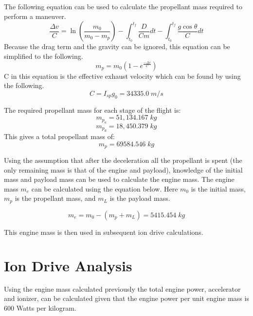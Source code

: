 \documentclass[journal ]{new-aiaa}
\begin{document}
\noindent The following equation can be used to calculate the propellant mass required to perform a maneuver.
\begin{equation}
    \frac{\Delta v}{C} =
    \ln{\left(\frac{m_0}{m_0-m_p}\right)}-\int_{t_0}^{t_f}{\frac{D}{C m}}dt - \int_{t_0}^{t_f}{\frac{g \cos{\theta}}{C}}dt
\end{equation} 
\noindent Because the drag term and the gravity can be ignored, this equation can be simplified to the following.
\begin{equation}
    m_p = m_0 \left(1 - e^{\frac{-\Delta v}{C}}\right)
\end{equation}
\noindent C in this equation is the effective exhaust velocity which can be found by using the following.
\begin{equation}
    C = I_{sp} g_0 = 34335.0 \;m/s
\end{equation}

\noindent The required propellant mass for each stage of the flight is:
\begin{equation*}
    m_{p_a} = \boxed{51,134.167\; kg}
\end{equation*}
\begin{equation*}
    m_{p_d} = \boxed{18,450.379\; kg}
\end{equation*}
This gives a total propellant mass of:
\begin{equation*}
    m_{p} = 69584.546\; kg
\end{equation*}

Using the assumption that after the deceleration all the propellant is spent (the only remaining mass is that of the engine and payload), knowledge of the initial mass and payload mass can be used to calculate the engine mass.
The engine mass $m_e$ can be calculated using the equation below. 
Here $m_0$ is the initial mass, $m_p$ is the propellant mass, and $m_L$ is the payload mass.

\begin{equation}
    m_e = m_0 - \left(m_p + m_L\right) = \boxed{5415.454 \;kg}
\end{equation}

\noindent This engine mass is then used in subsequent ion drive calculations. 
\pagebreak 

\section{Ion Drive Analysis}
Using the engine mass calculated previously the total engine power, accelerator and ionizer, can be calculated given that the engine power per unit engine mass is 600 Watts per kilogram.
\end{document}
